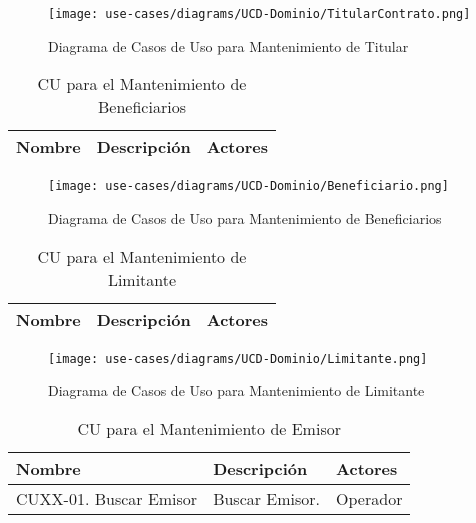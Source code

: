 	\begin{figure}[H]
		\begin{center}
		\label{tab:ucd-entity-titularcontrato}
		\texttt{[image: use-cases/diagrams/UCD-Dominio/TitularContrato.png]}
		\caption{Diagrama de Casos de Uso para Mantenimiento de Titular}
		\end{center}
	\end{figure}
	\begin{table}[H]
		\caption{CU para el Mantenimiento de Beneficiarios}
		\label{uc-entity-beneficiario}
		\begin{center}
		\begin{tabularx}{0.90\linewidth}{ X X X }
			\hline
			\textbf{Nombre} & \textbf{Descripci\'on} & \textbf{Actores} \\
			\hline
			\hline
		\end{tabularx}
		\end{center}
	\end{table}
	
	\begin{figure}[H]
		\begin{center}
		\label{tab:ucd-entity-beneficiario}
		\texttt{[image: use-cases/diagrams/UCD-Dominio/Beneficiario.png]}
		\caption{Diagrama de Casos de Uso para Mantenimiento de Beneficiarios}
		\end{center}
	\end{figure}
	\begin{table}[H]
		\caption{CU para el Mantenimiento de Limitante}
		\label{uc-entity-limitante}
		\begin{center}
		\begin{tabularx}{0.90\linewidth}{ X X X }
			\hline
			\textbf{Nombre} & \textbf{Descripci\'on} & \textbf{Actores} \\
			\hline
			\hline
		\end{tabularx}
		\end{center}
	\end{table}
	
	\begin{figure}[H]
		\begin{center}
		\label{tab:ucd-entity-limitante}
		\texttt{[image: use-cases/diagrams/UCD-Dominio/Limitante.png]}
		\caption{Diagrama de Casos de Uso para Mantenimiento de Limitante}
		\end{center}
	\end{figure}
	\begin{table}[H]
		\caption{CU para el Mantenimiento de Emisor}
		\label{uc-entity-emisor}
		\begin{center}
		\begin{tabularx}{0.90\linewidth}{ X X X }
			\hline
			\textbf{Nombre} & \textbf{Descripci\'on} & \textbf{Actores} \\
			\hline
			CUXX-01. Buscar Emisor & Buscar Emisor. & Operador \\
			\hline
		\end{tabularx}
		\end{center}
	\end{table}
	
